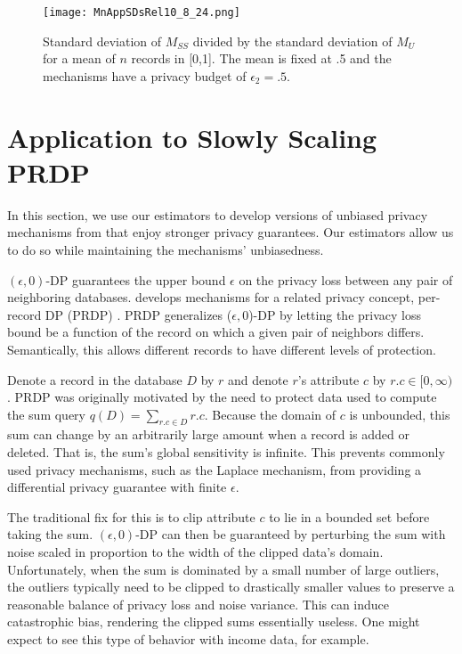 \documentclass[11pt]{article}
\begin{document}
\begin{figure}[H]
    \centering
    \texttt{[image: MnAppSDsRel10\_8\_24.png]}
    \caption{Standard deviation of $M_{SS}$ divided by the standard deviation of $M_U$ for a mean of $n$ records in [0,1]. The mean is fixed at .5 and the mechanisms have a privacy budget of $\epsilon_2 = .5$.}
    \label{fig:MnAppSDsRel}
\end{figure}







\section{Application to Slowly Scaling PRDP}
\label{sec:PRDP}

In this section, we use our estimators to develop versions of unbiased privacy mechanisms from \cite{finleyEtAl2024} that enjoy stronger privacy guarantees. Our estimators allow us to do so while maintaining the mechanisms' unbiasedness.

$(\epsilon,0)$-DP guarantees the upper bound $\epsilon$ on the privacy loss between any pair of neighboring databases. \cite{finleyEtAl2024} develops mechanisms for a related privacy concept, per-record DP (PRDP) \cite{seemanEtAl2024}. PRDP generalizes ($\epsilon,0$)-DP by letting the privacy loss bound be a function of the record on which a given pair of neighbors differs. Semantically, this allows different records to have different levels of protection.

Denote a record in the database $D$ by $r$ and denote $r$'s attribute $c$ by $r.c \in [0,\infty)$. PRDP was originally motivated by the need to protect data used to compute the sum query $q(D) = \sum_{r.c \in D} r.c$. Because the domain of $c$ is unbounded, this sum can change by an arbitrarily large amount when a record is added or deleted. That is, the sum's global sensitivity is infinite. This prevents commonly used privacy mechanisms, such as the Laplace mechanism, from providing a differential privacy guarantee with finite $\epsilon$.

The traditional fix for this is to clip attribute $c$ to lie in a bounded set before taking the sum. $(\epsilon,0)$-DP can then be guaranteed by perturbing the sum with noise scaled in proportion to the width of the clipped data's domain. Unfortunately, when the sum is dominated by a small number of large outliers, the outliers typically need to be clipped to drastically smaller values to preserve a reasonable balance of privacy loss and noise variance. This can induce catastrophic bias, rendering the clipped sums essentially useless. One might expect to see this type of behavior with income data, for example. 
\end{document}
